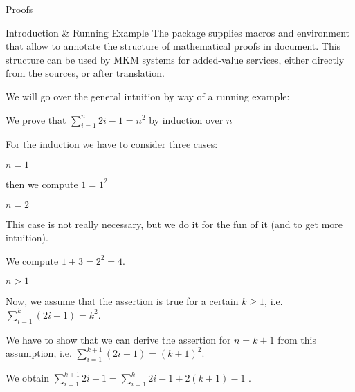 \begin{sfragment}{Proofs}

\begin{sfragment}{Introduction \& Running Example}
  The  package supplies macros and environment that allow to annotate the
  structure of mathematical proofs in \sTeX document. This structure can be used by MKM
  systems for added-value services, either directly from the \sTeX sources, or after
  translation.

  We will go over the general intuition by way of a running example: 

\begin{latexcode}
\begin{sproof}[id=simple-proof]
   {We prove that $\sum_{i=1}^n{2i-1}=n^{2}$ by induction over $n$}
  \begin{spfcases}{For the induction we have to consider three cases:}
   \begin{spfcase}{$n=1$}
    \begin{spfstep}[type=inline] then we compute $1=1^2$\end{spfstep}
   \end{spfcase}
   \begin{spfcase}{$n=2$}
      \begin{spfcomment}[type=inline]
        This case is not really necessary, but we do it for the
        fun of it (and to get more intuition).
      \end{spfcomment}
      \begin{spfstep}[type=inline] We compute $1+3=2^{2}=4$.\end{spfstep}
   \end{spfcase}
   \begin{spfcase}{$n>1$}
      \begin{spfstep}[type=assumption,id=ind-hyp]
        Now, we assume that the assertion is true for a certain $k\geq 1$,
        i.e. $\sum_{i=1}^k{(2i-1)}=k^{2}$.
      \end{spfstep}
      \begin{spfcomment}
        We have to show that we can derive the assertion for $n=k+1$ from
        this assumption, i.e. $\sum_{i=1}^{k+1}{(2i-1)}=(k+1)^{2}$.
      \end{spfcomment}
      \begin{spfstep}
        We obtain $\sum_{i=1}^{k+1}{2i-1}=\sum_{i=1}^k{2i-1}+2(k+1)-1$
        .
      \end{spfstep}

\end{spfcase}
\end{spfcases}
\end{sproof}
\end{latexcode}
\end{sfragment}
\end{sfragment}
